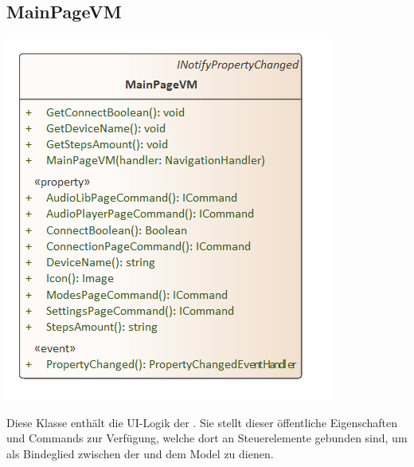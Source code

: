 \documentclass[../entwurf.tex]{subfiles}
\begin{document}
\subsection{MainPageVM}
\begin{minipage}{0.5\textwidth}
\includegraphics[scale=0.75]{../graphics/vm_klassen/MainPageVM.png}
\end{minipage}
\begin{minipage}{0.5\textwidth}
Diese Klasse enthält die UI-Logik der . Sie stellt dieser öffentliche Eigenschaften und Commands zur Verfügung, welche dort an Steuerelemente gebunden sind, um als Bindeglied zwischen der  und dem Model zu dienen.
\end{minipage}
\end{document}

